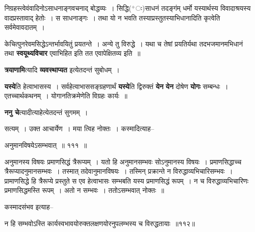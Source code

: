 \documentclass[article,12pt,a4paper]{memoir}
\newcommand{\add}[1]{($^{+}$#1)}
\begin{document}
	  \pstart निग्रहस्त्वेवंवादिनोऽसाधनाङ्गवचनाद् बोद्धव्यः । सिद्धि\add{ः}साधनं तदङ्गंम् धर्मो यस्यार्थस्य विवादाश्रयस्य वादप्रस्तावाद् हेतोः । स साधनाङ्गः । तथा यो न भवति तस्याप्रस्तुतस्याभिधानादिति कृत्वेति सर्वमेवावदातम् ।
	\pend
      

	  \pstart केचित्पुनरेवमसिद्धेऽन्तर्भावयितुं प्रयतन्ते । अन्ये तु विरुद्धे । यथा च तेषां प्रयतिर्यथा तदभजमानमभिधानं तथा \textbf{स्वयूथ्यविचार} एवाभिहित इति तत एवापेक्षितव्य इति ॥
	\pend
      

	  \pstart \textbf{त्रयाणामि}त्यादि \textbf{व्यवस्थाप्यत} इत्येतदन्तं सुबोधम् ।
	\pend
      

	  \pstart \textbf{यस्ये}ति हेत्वाभासस्य । सर्वहेत्वाभाससङ्ग्रहणार्थं \textbf{यस्ये}ति द्विरुक्तं \textbf{येन} \leavevmode{} \textbf{येन} दोषेण \textbf{योगः} सम्बन्धः । एतच्चार्थकथनम् । योगानतिक्रमेणेति विग्रहः कार्यः ॥
	\pend
      

	  \pstart \textbf{ननु चे}त्यादीत्याहेत्येतदन्तं सुगमम् ।
	\pend
	  \bigskip
	  \begingroup
	

	  \pstart सत्यम् । उक्त आचार्येण । मया त्विह नोक्तः । कस्मादित्याह--
	\pend
        
	  \bigskip
	  \begingroup
	

	  \pstart अनुमानविषयेऽसम्भवात् ॥ १११ ॥
	\pend
      
	  \endgroup
	 

	  \pstart अनुमानस्य विषयः प्रमाणसिद्धं त्रैरूप्यम् । यतो हि अनुमानसम्भवः सोऽनुमानस्य विषयः । प्रमाणसिद्धाच्च त्रैरूप्यादनुमानसम्भवः । तस्मात् तदेवानुमानविषयः । तस्मिन् प्रक्रान्ते न विरुद्धाव्यभिचारिसम्भवः । प्रामाणसिद्धे हि त्रैरूप्ये प्रस्तुते स एव हेत्वाभासः सम्भबति यस्य प्रमाणसिद्धं रूपम् । न च विरुद्धाव्यभिचारिणः प्रमाणसिद्धमस्ति रूपम् । अतो न सम्भवः । ततोऽसम्भवात् नोक्तः ॥
	\pend
        

	  \pstart कस्मादसंभव इत्याह--
	\pend
        
	  \bigskip
	  \begingroup
	

	  \pstart न हि सम्भवोऽस्ति कार्यस्वभावयोरुक्तलक्षणयोरनुपलम्भस्य च विरुद्धतायाः ॥११२॥
	\pend
      
\end{document}
